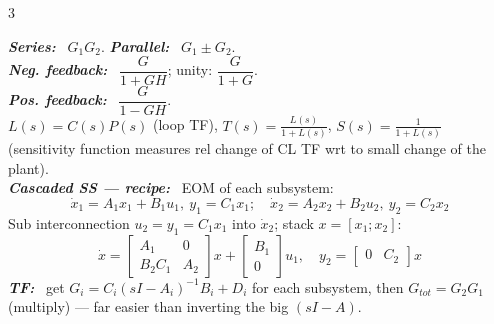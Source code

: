 \documentclass[9pt]{extarticle}
\newcommand{\sect}[1]{%
  \vspace{2pt}\par\noindent
  \colorbox{hdrbg}{\makebox[\dimexpr\linewidth-2\fboxsep][l]{%
    \textbf{\footnotesize\textcolor{hdr}{#1}}}}%
  \par\vspace{1.5pt}}
\newcommand{\sub}[1]{\textit{\textbf{#1:}}\ }
\begin{document}
\begin{multicols}{3}

\sect{19. Block Diagram Algebra}
\sub{Series} $G_1G_2$. \sub{Parallel} $G_1\pm G_2$.\\
\sub{Neg. feedback} $\dfrac{G}{1+GH}$; unity: $\dfrac{G}{1+G}$.\\
\sub{Pos. feedback} $\dfrac{G}{1-GH}$.\\
$L(s)=C(s)P(s)$ (loop TF), $T(s)=\tfrac{L(s)}{1+L(s)}$, $S(s)=\tfrac{1}{1+L(s)}$ (sensitivity function measures rel change of CL TF wrt to small change of the plant).\\
\sub{Cascaded SS — recipe} EOM of each subsystem:
\[ \dot x_1{=}A_1x_1{+}B_1u_1,\ y_1{=}C_1x_1;\quad \dot x_2{=}A_2x_2{+}B_2u_2,\ y_2{=}C_2x_2 \]
Sub interconnection $u_2{=}y_1{=}C_1x_1$ into $\dot x_2$; stack $x{=}[x_1;x_2]$:
\[ \dot x=\begin{bmatrix}A_1&0\\B_2C_1&A_2\end{bmatrix}x+\begin{bmatrix}B_1\\0\end{bmatrix}u_1,\quad y_2=\begin{bmatrix}0&C_2\end{bmatrix}x \]
\sub{TF} get $G_i{=}C_i(sI{-}A_i)^{-1}B_i{+}D_i$ for each subsystem, then $G_{tot}{=}G_2G_1$ (multiply) — far easier than inverting the big $(sI{-}A)$.


\end{multicols}
\end{document}
